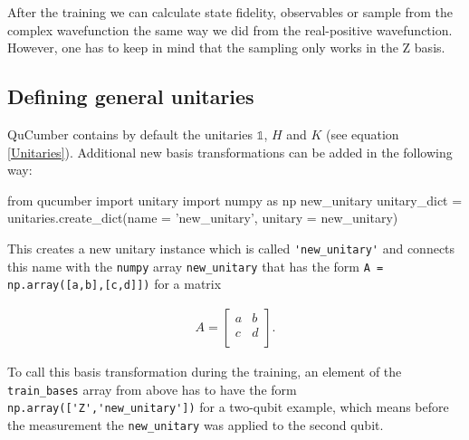\documentclass[submission, Phys]{SciPost}
\begin{document}
After the training we can calculate state fidelity, observables or sample from the complex wavefunction
the same way we did from the real-positive wavefunction. However, one has to keep in mind that the sampling only works in the Z basis.

\subsection{Defining general unitaries}

QuCumber contains by default the unitaries $\mathds{1}$, $H$ and $K$ (see equation \ref{Unitaries}).
Additional new basis transformations can be added in the following way:
\begin{python}
	from qucumber import unitary
	import numpy as np
	new_unitary
	unitary_dict = unitaries.create_dict(name = 'new_unitary', unitary = new_unitary)
\end{python}
This creates a new unitary instance which is called \verb|'new_unitary'| and connects this name with the \verb|numpy| array
\verb|new_unitary| that has the form \verb|A = np.array([a,b],[c,d]])| for a matrix

\begin{align}
	A =
	\begin{bmatrix}
		a & b \\
		c & d \\
	\end{bmatrix}.
\end{align}

To call this basis transformation during the training, an element of the \verb|train_bases| array from above has to have the form
\verb|np.array(['Z','new_unitary'])| for a two-qubit example,
which means before the measurement the \verb|new_unitary| was applied to the second qubit.
\end{document}
